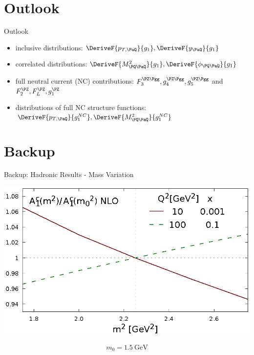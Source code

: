 \section{Outlook}
\begin{frame}{Outlook}
\begin{itemize}
\item inclusive distributions: $\DeriveF{{p_{T,\PaQ}}}{g_1},\DeriveF{{y_{\PaQ}}}{g_1}$
\item correlated distributions: $\DeriveF{{M_{\PQ\PaQ}^2}}{g_1}, \DeriveF{\phi_{\PQ\PaQ}}{g_1}$
\item<2-> full neutral current (NC) contributions: $F_3^{\PZ\Pgg}, g_4^{\PZ\Pgg}, g_5^{\PZ\Pgg}$ and $F_2^{\PZ}, F_L^{\PZ}, g_1^{\PZ}$
\item<2-> distributions of full NC structure functions: $\DeriveF{p_{T,\PaQ}}{g_1^{NC}},\DeriveF{{M_{\PQ\PaQ}^2}}{g_1^{NC}}$
\end{itemize}

\end{frame}

\section*{Backup}
\begin{frame}{Backup: Hadronic Results - Mass Variation}
\begin{center}
\includegraphics[width=.75\textwidth]{img/A1-m2}
\end{center}
\[m_0=\SI{1.5}{\GeV}\]
\end{frame}
